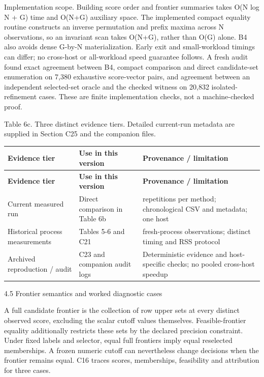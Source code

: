 \documentclass[11pt,a4paper]{article}
\begin{document}
Implementation scope. Building score order and frontier summaries takes O(N log N + G) time and O(N+G) auxiliary space. The implemented compact equality routine constructs an inverse permutation and prefix maxima across N observations, so an invariant scan takes O(N+G), rather than O(G) alone. B4 also avoids dense G-by-N materialization. Early exit and small-workload timings can differ; no cross-host or all-workload speed guarantee follows. A fresh audit found exact agreement between B4, compact comparison and direct candidate-set enumeration on 7,380 exhaustive score-vector pairs, and agreement between an independent selected-set oracle and the checked witness on 20,832 isolated-refinement cases. These are finite implementation checks, not a machine-checked proof.

Table 6c. Three distinct evidence tiers. Detailed current-run metadata are supplied in Section C25 and the companion files.

{\footnotesize
\setlength{\tabcolsep}{3pt}
\renewcommand{\arraystretch}{1.15}
\begin{longtable}{>{\raggedright\arraybackslash}p{0.21739\dimexpr\textwidth-6\tabcolsep\relax}>{\raggedright\arraybackslash}p{0.30435\dimexpr\textwidth-6\tabcolsep\relax}>{\raggedright\arraybackslash}p{0.47826\dimexpr\textwidth-6\tabcolsep\relax}}
\toprule
\textbf{Evidence tier} & \textbf{Use in this version} & \textbf{Provenance / limitation} \\
\midrule
\endfirsthead
\toprule
\textbf{Evidence tier} & \textbf{Use in this version} & \textbf{Provenance / limitation} \\
\midrule
\endhead
Current measured run & Direct comparison in Table 6b & 10 repetitions per method; chronological CSV and metadata; one host \\
Historical process measurements & Tables 5-6 and C21 & 54 fresh-process observations; distinct timing and RSS protocol \\
Archived reproduction / audit & C23 and companion audit logs & Deterministic evidence and host-specific checks; no pooled cross-host speedup \\
\bottomrule
\end{longtable}
}
4.5 Frontier semantics and worked diagnostic cases

A full candidate frontier is the collection of row upper sets at every distinct observed score, excluding the scalar cutoff values themselves. Feasible-frontier equality additionally restricts these sets by the declared precision constraint. Under fixed labels and selector, equal full frontiers imply equal reselected memberships. A frozen numeric cutoff can nevertheless change decisions when the frontier remains equal. C16 traces scores, memberships, feasibility and attribution for three cases.
\end{document}
